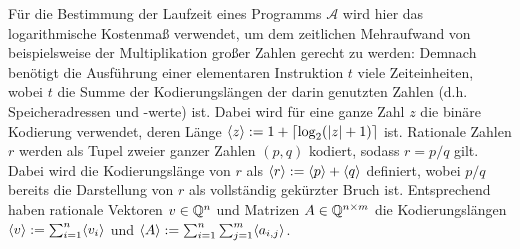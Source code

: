 Für die Bestimmung der Laufzeit eines Programms $\mathcal{A}$ wird hier das logarithmische Kostenmaß verwendet, um dem zeitlichen Mehraufwand von beispielsweise der Multiplikation großer Zahlen gerecht zu werden:
Demnach benötigt die Ausführung einer elementaren Instruktion $t$ viele Zeiteinheiten, wobei $t$ die Summe der Kodierungslängen der darin genutzten Zahlen (d.h. Speicheradressen und -werte) ist.
Dabei wird für eine ganze Zahl $z$ die binäre Kodierung verwendet, deren Länge $\langle z\rangle := 1 + \lceil \log_2(\lvert z\rvert+1) \rceil$ ist.
Rationale Zahlen $r$ werden als Tupel zweier ganzer Zahlen $(p,q)$ kodiert, sodass $r = p/q$ gilt.
Dabei wird die Kodierungslänge von $r$ als $\langle r\rangle:= \langle p\rangle + \langle q\rangle$ definiert, wobei $p/q$ bereits die Darstellung von $r$ als vollständig gekürzter Bruch ist.
Entsprechend haben rationale Vektoren $v\in\mathbb{Q}^n$ und Matrizen $A\in\mathbb{Q}^{n\times m}$ die Kodierungslängen $\langle v\rangle := \sum_{i=1}^n \langle v_i\rangle$ und $\langle A\rangle:= \sum_{i=1}^n\sum_{j=1}^m \langle a_{i,j}\rangle$.

